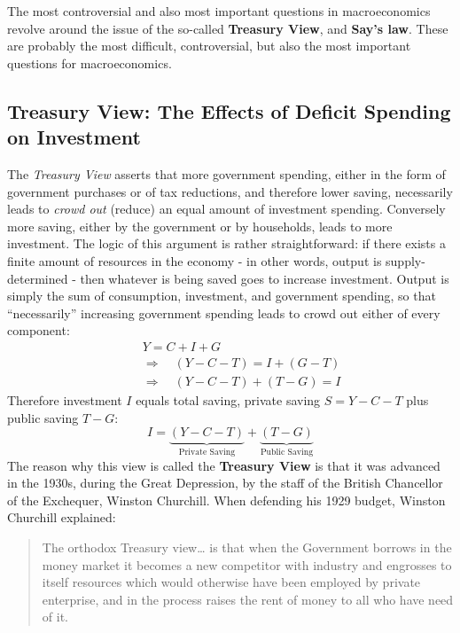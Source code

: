 \documentclass[]{book}
\begin{document}
The most controversial and also most important questions in
macroeconomics revolve around the issue of the so-called
\textbf{Treasury View}, and \textbf{Say's law}. These are probably the
most difficult, controversial, but also the most important questions for
macroeconomics.

\subsection{Treasury View: The Effects of Deficit Spending on
Investment}\label{treasury-view-the-effects-of-deficit-spending-on-investment}

The \emph{Treasury View} asserts that more government spending, either
in the form of government purchases or of tax reductions, and therefore
lower saving, necessarily leads to \emph{crowd out} (reduce) an equal
amount of investment spending. Conversely more saving, either by the
government or by households, leads to more investment. The logic of this
argument is rather straightforward: if there exists a finite amount of
resources in the economy - in other words, output is supply-determined -
then whatever is being saved goes to increase investment. Output is
simply the sum of consumption, investment, and government spending, so
that ``necessarily'' increasing government spending leads to crowd out
either of every component: \[
\begin{aligned}
&Y = C+I+G\\
\quad &  \Rightarrow \quad \left(Y- C-T\right)=I+\left(G-T\right) \\
\quad &  \Rightarrow \quad \left(Y- C-T\right) + \left(T-G\right)=I
\end{aligned}
\] Therefore investment \(I\) equals total saving, private saving
\(S=Y-C-T\) plus public saving \(T-G\):
\[\boxed{I = \underbrace{\left(Y-C-T\right)}_{\text{Private Saving}} + \underbrace{(T-G)}_{\text{Public Saving}}}\]
The reason why this view is called the \textbf{Treasury View} is that it
was advanced in the 1930s, during the Great Depression, by the staff of
the British Chancellor of the Exchequer, Winston Churchill. When
defending his 1929 budget, Winston Churchill explained:

\begin{quote}
The orthodox Treasury view\ldots{} is that when the Government borrows
in the money market it becomes a new competitor with industry and
engrosses to itself resources which would otherwise have been employed
by private enterprise, and in the process raises the rent of money to
all who have need of it.
\end{quote}
\end{document}
